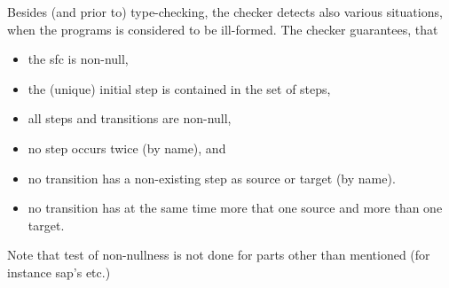 Besides (and prior to) type-checking, the checker detects also various
situations, when the programs is considered to be ill-formed. The checker
guarantees, that
\begin{itemize}
\item the sfc is non-null, 
\item the (unique) initial step is contained in the set of steps,
\item all steps and transitions are non-null, 
\item no step occurs twice (by name), and
\item no transition has a non-existing step as source or target (by name).
\item no transition has at the same time more that one source and more
than one target.
\end{itemize}
Note that test of non-nullness is not done for parts other than mentioned
(for instance sap's etc.)  





